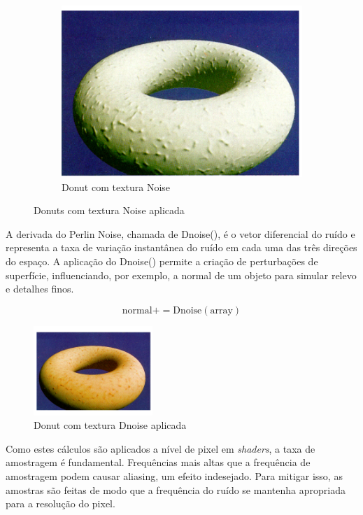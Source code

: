\begin{figure}[H]
\begin{subfigure}{0.32\textwidth}
        \includegraphics[width=\textwidth]{img/donut3.png}
        \caption{Donut com textura Noise}
        \label{fig:cube_noise}
    \end{subfigure}
    \caption{Donuts com textura Noise aplicada}
    \label{fig:all_shapes_noise}
\end{figure}

A derivada do Perlin Noise, chamada de Dnoise(), é o vetor diferencial do ruído e representa a taxa de variação instantânea do ruído em cada uma das três direções do espaço. A aplicação do Dnoise() permite a criação de perturbações de superfície, influenciando, por exemplo, a normal de um objeto para simular relevo e detalhes finos.

$$
\text{normal} += \text{Dnoise}(\text{array})
$$

\begin{figure}[H]
    \centering
    \includegraphics[width=0.4\textwidth]{img/donut4.png}
    \caption{Donut com textura Dnoise aplicada}
    \label{fig:donut_dnoise}
\end{figure}

Como estes cálculos são aplicados a nível de pixel em \textit{shaders}, a taxa de amostragem é fundamental. Frequências mais altas que a frequência de amostragem podem causar aliasing, um efeito indesejado. Para mitigar isso, as amostras são feitas de modo que a frequência do ruído se mantenha apropriada para a resolução do pixel.

